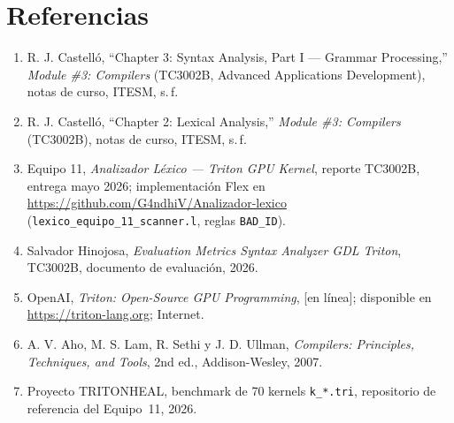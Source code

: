 \section{Referencias}

\begin{enumerate}
  \item R. J. Castelló, ``Chapter 3: Syntax Analysis, Part I --- Grammar Processing,'' \textit{Module \#3: Compilers} (TC3002B, Advanced Applications Development), notas de curso, ITESM, s.\,f.
  \item R. J. Castelló, ``Chapter 2: Lexical Analysis,'' \textit{Module \#3: Compilers} (TC3002B), notas de curso, ITESM, s.\,f.
  \item Equipo 11, \textit{Analizador Léxico --- Triton GPU Kernel}, reporte TC3002B, entrega mayo 2026; implementación Flex en \url{https://github.com/G4ndhiV/Analizador-lexico} (\texttt{lexico\_equipo\_11\_scanner.l}, reglas \texttt{BAD\_ID}).
  \item Salvador Hinojosa, \textit{Evaluation Metrics Syntax Analyzer GDL Triton}, TC3002B, documento de evaluación, 2026.
  \item OpenAI, \textit{Triton: Open-Source GPU Programming}, [en línea]; disponible en \url{https://triton-lang.org}; Internet.
  \item A. V. Aho, M. S. Lam, R. Sethi y J. D. Ullman, \textit{Compilers: Principles, Techniques, and Tools}, 2nd ed., Addison-Wesley, 2007.
  \item Proyecto TRITONHEAL, benchmark de 70 kernels \texttt{k\_*.tri}, repositorio de referencia del Equipo~11, 2026.
\end{enumerate}
